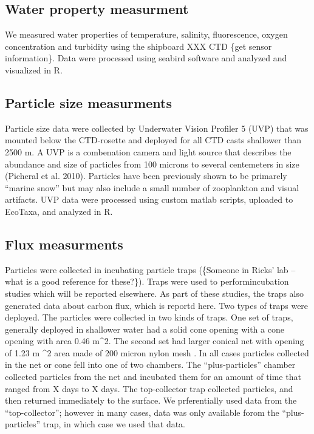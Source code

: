 \documentclass[]{article}
\begin{document}
\hypertarget{water-property-measurment}{%
\subsection{Water property measurment}\label{water-property-measurment}}

We measured water properties of temperature, salinity, fluorescence,
oxygen concentration and turbidity using the shipboard XXX CTD \{get
sensor information\}. Data were processed using seabird software and
analyzed and visualized in R.

\hypertarget{particle-size-measurments}{%
\subsection{Particle size measurments}\label{particle-size-measurments}}

Particle size data were collected by Underwater Vision Profiler 5 (UVP)
that was mounted below the CTD-rosette and deployed for all CTD casts
shallower than 2500 m. A UVP is a combenation camera and light source
that describes the abundance and size of particles from 100 microns to
several centemeters in size (Picheral et al. 2010). Particles have been
previously shown to be primarely ``marine snow'' but may also include a
small number of zooplankton and visual artifacts. UVP data were
processed using custom matlab scripts, uploaded to EcoTaxa, and analyzed
in R.

\hypertarget{flux-measurments}{%
\subsection{Flux measurments}\label{flux-measurments}}

Particles were collected in incubating particle traps (\{Someone in
Ricks' lab -- what is a good reference for these?\}). Traps were used to
performincubation studies which will be reported elsewhere. As part of
these studies, the traps also generated data about carbon flux, which is
reportd here. Two types of traps were deployed. The particles were
collected in two kinds of traps. One set of traps, generally deployed in
shallower water had a solid cone opening with a cone opening with area
0.46 m\^{}2. The second set had larger conical net with opening of 1.23
m \^{}2 area made of 200 micron nylon mesh . In all cases particles
collected in the net or cone fell into one of two chambers. The
``plus-particles'' chamber collected particles from the net and
incubated them for an amount of time that ranged from X days to X days.
The top-collector trap collected particles, and then returned
immediately to the surface. We prferentially used data from the
``top-collector''; however in many cases, data was only available forom
the ``plus-particles'' trap, in which case we used that data.
\end{document}
